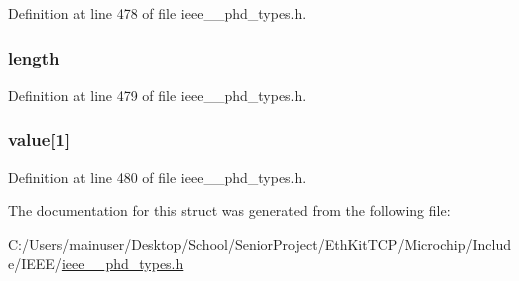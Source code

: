 Definition at line 478 of file ieee\+\_\+\_\+phd\+\_\+types.\+h.

\hypertarget{struct___segment_statistics_a3743679e4ff85e3e1b3fc2e59973fbb3}{}
\subsubsection[{length}]{ length}\label{struct___segment_statistics_a3743679e4ff85e3e1b3fc2e59973fbb3}


Definition at line 479 of file ieee\+\_\+\_\+phd\+\_\+types.\+h.

\hypertarget{struct___segment_statistics_adbb7016834e72a9cad0fd83e016a6fd6}{}
\subsubsection[{value}]{ value\mbox{[}1\mbox{]}}\label{struct___segment_statistics_adbb7016834e72a9cad0fd83e016a6fd6}


Definition at line 480 of file ieee\+\_\+\_\+phd\+\_\+types.\+h.



The documentation for this struct was generated from the following file\+:\begin{DoxyCompactItemize}
\item 
C\+:/\+Users/mainuser/\+Desktop/\+School/\+Senior\+Project/\+Eth\+Kit\+T\+C\+P/\+Microchip/\+Include/\+I\+E\+E\+E/\hyperlink{ieee__11073__phd__types_8h}{ieee\+\_\+\_\+phd\+\_\+types.\+h}\end{DoxyCompactItemize}
